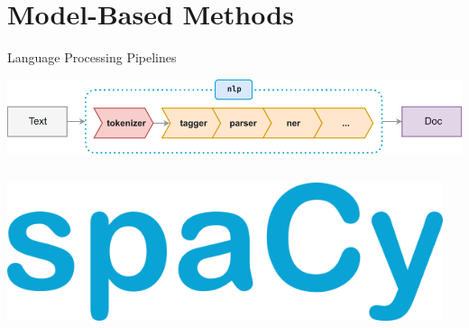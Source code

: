 \documentclass[10pt]{beamer}
\begin{document}
\section{Model-Based Methods}

\begin{frame}{Language Processing Pipelines}

\begin{center}
  \includegraphics[width=1.0\textwidth]{figures/spacy-pipeline.png}
  \\ \vspace{2em}
  \begin{columns}
    \begin{column}{0.3\textwidth}
      \begin{center}
        \includegraphics[scale=0.18]{figures/spacy-logo.png}
      \end{center}
    \end{column}
    \begin{column}{0.7\textwidth}
    \end{column}
  \end{columns}
\end{center}

\end{frame}
\end{document}
